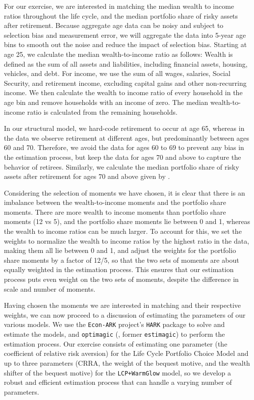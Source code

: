 \documentclass{article}
\begin{document}
For our exercise, we are interested in matching the median wealth to income ratios throughout the life cycle, and the median portfolio share of risky assets after retirement.
Because aggregate age data can be noisy and subject to selection bias and measurement error, we will aggregate the data into 5-year age bins to smooth out the noise and reduce the impact of selection bias.
Starting at age 25, we calculate the median wealth-to-income ratio as follows: Wealth is defined as the sum of all assets and liabilities, including financial assets, housing, vehicles, and debt.
For income, we use the sum of all wages, salaries, Social Security, and retirement income, excluding capital gains and other non-recurring income.
We then calculate the wealth to income ratio of every household in the age bin and remove households with an income of zero.
The median wealth-to-income ratio is calculated from the remaining households.

In our structural model, we hard-code retirement to occur at age 65, whereas in the data we observe retirement at different ages, but predominantly between ages 60 and 70.
Therefore, we avoid the data for ages 60 to 69 to prevent any bias in the estimation process, but keep the data for ages 70 and above to capture the behavior of retirees.
Similarly, we calculate the median portfolio share of risky assets after retirement for ages 70 and above given by \cite{Aboagye2024}.

Considering the selection of moments we have chosen, it is clear that there is an imbalance between the wealth-to-income moments and the portfolio share moments.
There are more wealth to income moments than portfolio share moments (12 vs 5), and the portfolio share moments lie between 0 and 1, whereas the wealth to income ratios can be much larger.
To account for this, we set the weights to normalize the wealth to income ratios by the highest ratio in the data, making them all lie between 0 and 1, and adjust the weights for the portfolio share moments by a factor of 12/5, so that the two sets of moments are about equally weighted in the estimation process.
This ensures that our estimation process puts even weight on the two sets of moments, despite the difference in scale and number of moments.

Having chosen the moments we are interested in matching and their respective weights, we can now proceed to a discussion of estimating the parameters of our various models.
We use the \texttt{Econ-ARK} project's \texttt{HARK} package to solve and estimate the models, and \texttt{optimagic} (\cite{Gabler2022}, former \texttt{estimagic}) to perform the estimation process.
Our exercise consists of estimating one parameter (the coefficient of relative risk aversion) for the Life Cycle Portfolio Choice Model and up to three parameters (CRRA, the weight of the bequest motive, and the wealth shifter of the bequest motive) for the \texttt{LCP+WarmGlow} model, so we develop a robust and efficient estimation process that can handle a varying number of parameters. 
\end{document}
